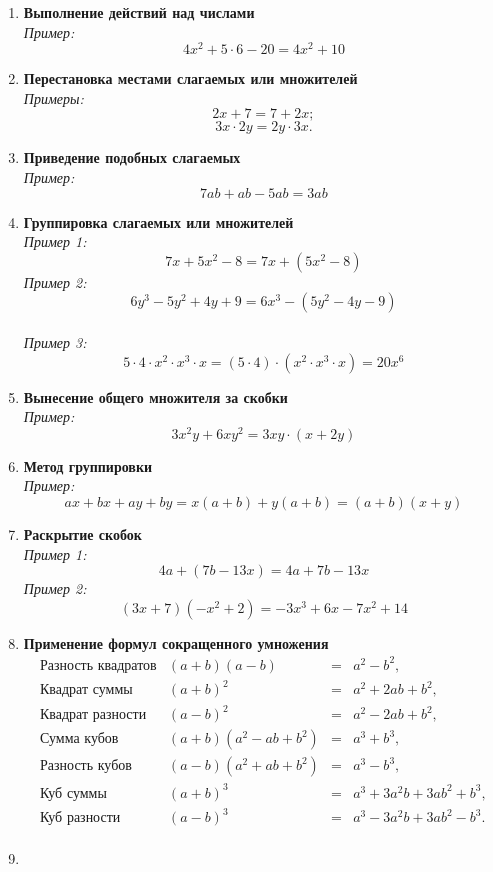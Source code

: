 \documentclass[12pt, a4paper]{article}
\begin{document}
	\begin{enumerate}
		\item 
			\textbf{Выполнение действий над числами}\\[0.5em]
			\textit{Пример:}
			$$4x^2+5\cdot6-20=4x^2+10$$
		\item
			\textbf{Перестановка местами слагаемых или множителей}\\[0.5em]
			\textit{Примеры:}
			$$2x+7=7+2x;$$
			$$3x\cdot 2y=2y\cdot 3x.$$
		\item
			\textbf{Приведение подобных слагаемых}\\[0.5em]
			\textit{Пример:}
			$$7ab+ab-5ab=3ab$$
		\item
			\textbf{Группировка слагаемых или множителей}\\[0.5em]
			\textit{Пример 1:}
			$$7x+5x^2-8=7x+(5x^2-8)$$
			\textit{Пример 2:}
			$$6y^3-5y^2+4y+9=6x^3-(5y^2-4y-9)$$\\
			\textit{Пример 3:}
			$$5\cdot4\cdot x^2\cdot x^3\cdot x=(5\cdot4)\cdot(x^2\cdot x^3\cdot x)=20x^6$$
		\item
			\textbf{Вынесение общего множителя за скобки}\\[0.5em]
			\textit{Пример:}
			$$3x^2y+6xy^2=3xy\cdot(x+2y)$$
		\item
			\textbf{Метод группировки}\\[0.5em]
			\textit{Пример:}
			$$ax+bx+ay+by=x(a+b)+y(a+b)=(a+b)(x+y)$$
		\item
			\textbf{Раскрытие скобок}\\[0.5em]
			\textit{Пример 1:}
			$$4a+(7b-13x)=4a+7b-13x$$
			\textit{Пример 2:}
			$$(3x+7)(-x^2+2)=-3x^3+6x-7x^2+14$$
		\item
			\textbf{Применение формул сокращенного умножения}
			$$\begin{array}{cccc}
				\text{Разность квадратов}&(a+b)(a-b)& =&a^2-b^2,\\
				\text{Квадрат суммы}&(a+b)^2& =&a^2+2ab+b^2,\\
				\text{Квадрат разности}&(a-b)^2& =&a^2-2ab+b^2,\\
				\text{Сумма кубов}&(a+b)(a^2-ab+b^2)& =&a^3+b^3,\\
				\text{Разность кубов}&(a-b)(a^2+ab+b^2)& =&a^3-b^3,\\
				\text{Куб суммы}&(a+b)^3& =&a^3+3a^2b+3ab^2+b^3,\\
				\text{Куб разности}&(a-b)^3& =&a^3-3a^2b+3ab^2-b^3.\\
			\end{array}$$
		\item

\end{enumerate}
\end{document}
